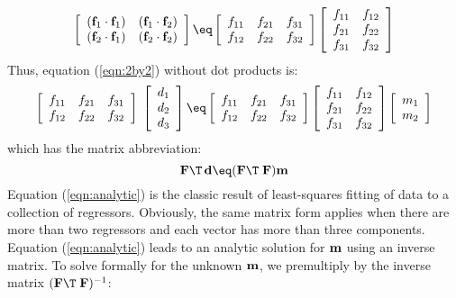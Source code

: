 \begin{equation}
\left[ 
\begin{array}{ccc}
  (\ff_1 \cdot \ff_1) & (\ff_1 \cdot \ff_2)  \\
  (\ff_2 \cdot \ff_1) & (\ff_2 \cdot \ff_2)  \end{array} \right] 
 \eq
\left[ 
\begin{array}{ccc}
  f_{11} & f_{21} & f_{31}  \\
  f_{12} & f_{22} & f_{32}  \end{array} \right] 
\left[ 
\begin{array}{ccc}
  f_{11} & f_{12}  \\
  f_{21} & f_{22}  \\
  f_{31} & f_{32}  \end{array} \right] 
\label{eqn:covmat}
\end{equation}
Thus, equation (\ref{eqn:2by2}) without dot products is:
\begin{equation}
\left[ 
\begin{array}{ccc}
  f_{11} & f_{21} & f_{31}  \\
  f_{12} & f_{22} & f_{32}  \end{array} \right] 
\; \left[ 
\begin{array}{c}
  d_1 \\ 
  d_2 \\ 
  d_3 \end{array} \right]
\eq
\left[ 
\begin{array}{ccc}
  f_{11} & f_{21} & f_{31}  \\
  f_{12} & f_{22} & f_{32}  \end{array} \right] 
\left[ 
\begin{array}{ccc}
  f_{11} & f_{12}  \\
  f_{21} & f_{22}  \\
  f_{31} & f_{32}  \end{array} \right] 
\left[ 
\begin{array}{ccc}
  m_1  \\
  m_2  \end{array} \right] 
\label{eqn:allmats}
\end{equation}
which has the matrix abbreviation:
\begin{equation}
\bold F\T\,\dd \eq ( \bold F\T \; \bold F )  \bold m
\label{eqn:analytic}
\end{equation}
Equation
(\ref{eqn:analytic})
is the classic result of least-squares
fitting of data to a collection of regressors.
Obviously, the same matrix form applies when there are more than
two regressors and each vector has more than three components.
Equation
(\ref{eqn:analytic})
leads to an analytic solution for $\bold m$
using an inverse matrix.
To solve formally for the unknown $\bold m$,
we premultiply by the inverse matrix $( \bold F\T \; \bold F )^{-1}$:

